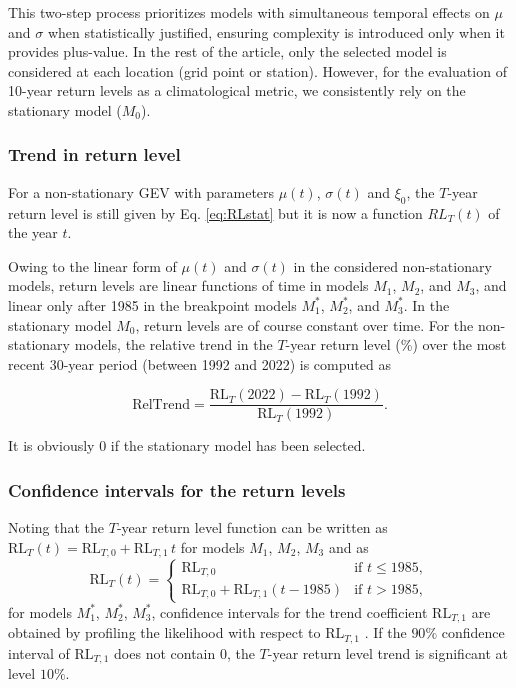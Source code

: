 \documentclass[hess, manuscript]{copernicus}
\begin{document}
This two-step process prioritizes models with simultaneous temporal
effects on \(\mu\) and \(\sigma\) when statistically justified, ensuring
complexity is introduced only when it provides plus-value. In the rest of the article, only the selected model is considered at each location (grid point or station). However, for the evaluation of 10-year return levels as a climatological metric, we consistently rely on the stationary model ($M_0$). 

\subsubsection{Trend in return level}\label{return-level}

For a non-stationary GEV with parameters $\mu(t)$, $\sigma(t)$ and $\xi_{0}$, the $T$-year return level is still given by Eq. \ref{eq:RLstat} but it is now a function $RL_T(t)$ of the year $t$.

Owing to the linear form of $\mu(t)$ and $\sigma(t)$ in the considered
non-stationary models, return levels are linear functions of time in
models $M_{1}$, $M_{2}$, and $M_{3}$, and linear only after 1985 in the
breakpoint models $M_{1}^{*}$, $M_{2}^{*}$, and $M_{3}^{*}$. In the
stationary model $M_{0}$, return levels are of course constant over time.
For the non-stationary models, the relative trend in the $T$-year return
level (\%) over the most recent 30-year period (between 1992 and 2022) is computed as

\[
\mathrm{RelTrend} =
\frac{\mathrm{RL}_{T}(2022)-\mathrm{RL}_{T}(1992)}
{\mathrm{RL}_{T}(1992)}.
\]

It is obviously $0$ if the stationary model has been selected.

\subsubsection{Confidence intervals for the return levels}\label{maximu-likelihood-estimation-and-confidence-intervales}

Noting that the
$T$-year return level function can be written as
$\mathrm{RL}_{T}(t)=\mathrm{RL}_{T,0}+\mathrm{RL}_{T,1}\, t$
for models $M_{1}$, $M_{2}$, $M_{3}$ and as
\[
\mathrm{RL}_{T}(t)=
\begin{cases}
\mathrm{RL}_{T,0} & \text{if } t \leq 1985,\\[4pt]
\mathrm{RL}_{T,0}+\mathrm{RL}_{T,1}(t-1985) & \text{if } t>1985,
\end{cases}
\]
for models $M_{1}^{*}$, $M_{2}^{*}$, $M_{3}^{*}$,
confidence intervals for the trend coefficient $\mathrm{RL}_{T,1}$ are obtained
by profiling the likelihood with respect to $\mathrm{RL}_{T,1}$ \citep{coles2001introduction}. If
the $90\%$ confidence interval of $\mathrm{RL}_{T,1}$ does not contain $0$, the
$T$-year return level trend is significant at level $10\%$.
\end{document}

